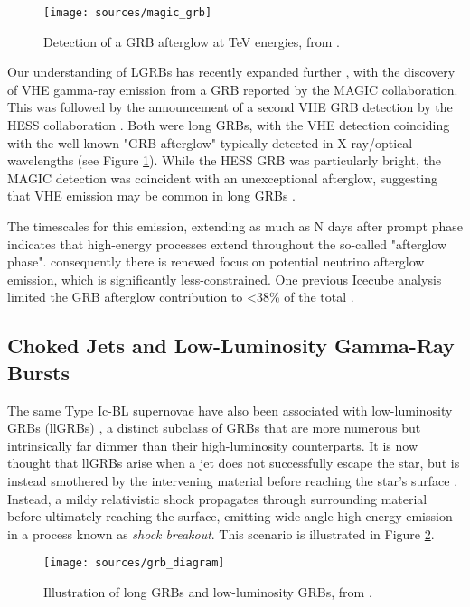 \begin{figure}[!ht]
	\centering \texttt{[image: sources/magic\_grb]}
	\caption{Detection of a GRB afterglow at TeV energies, from \cite{magic_grb_19}.}
	\label{fig:magic_grb}
\end{figure}

Our understanding of LGRBs has recently expanded further , with the discovery of VHE gamma-ray emission from a GRB reported by the MAGIC collaboration. This was followed by the announcement of a second VHE GRB detection by the HESS collaboration . Both were long GRBs, with the VHE detection coinciding with the well-known "GRB afterglow" typically detected in X-ray/optical wavelengths (see Figure \ref{fig:magic_grb}). While the HESS GRB was particularly bright, the MAGIC detection was coincident with an unexceptional afterglow, suggesting that VHE emission may be common in long GRBs .

The timescales for this emission, extending as much as N days after prompt phase indicates that high-energy processes extend throughout the so-called "afterglow phase". consequently there is renewed focus on potential neutrino afterglow  emission, which is significantly less-constrained. One previous Icecube analysis limited the GRB afterglow  contribution to <38\% of the total .

\subsection{Choked Jets and Low-Luminosity Gamma-Ray Bursts}

The same Type Ic-BL supernovae have also been associated with low-luminosity GRBs (llGRBs)  , a distinct subclass of GRBs that are more numerous but intrinsically far dimmer than their high-luminosity counterparts. It is now thought that llGRBs arise when a jet does not successfully escape the star, but is instead smothered by the intervening material before reaching the star's surface . Instead, a mildy relativistic shock propagates through surrounding material before ultimately reaching the surface, emitting wide-angle high-energy emission in a process known as \emph{shock breakout}. This scenario is illustrated in Figure \ref{fig:grb_diagram}.

\begin{figure}[!ht]
	\centering \texttt{[image: sources/grb\_diagram]}
	\caption{Illustration of long GRBs and low-luminosity GRBs, from \cite{nakar_15_llgrb}.}
	\label{fig:grb_diagram}
\end{figure}

